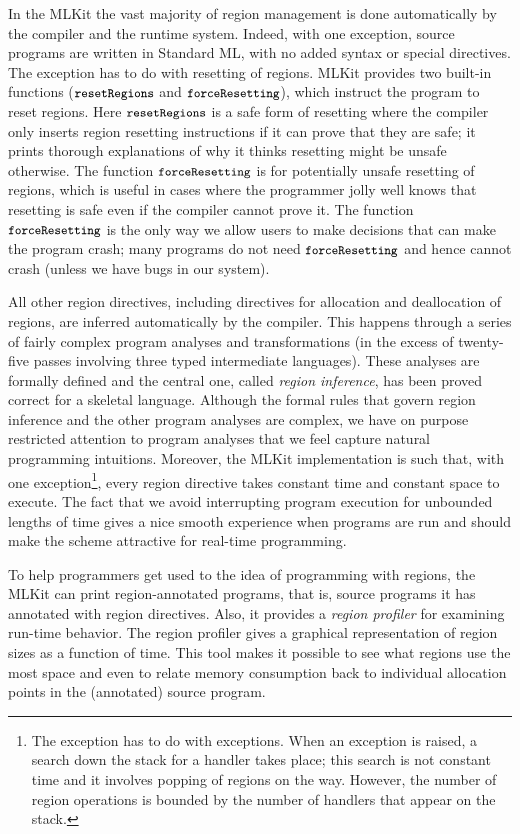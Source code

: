 \documentclass[12pt]{book}
\begin{document}
In the MLKit the vast majority of region management is done automatically by the
compiler and the runtime system.  Indeed, with one exception, source programs
are written in Standard ML, with no added syntax or special directives. The
exception has to do with resetting of regions. MLKit provides two built-in
functions
%
%
%
($\mbox{\small\ttfamily resetRegions}$ and $\mbox{\small\ttfamily forceResetting}$), which instruct the program to reset regions. Here
$\mbox{\small\ttfamily resetRegions}$ is a safe form of resetting where the compiler only inserts region
resetting instructions if it can prove that they are safe; it prints thorough
explanations of why it thinks resetting might be unsafe otherwise. The function
$\mbox{\small\ttfamily forceResetting}$ is for potentially unsafe resetting of regions, which is useful in
cases where the programmer jolly well knows that resetting is safe even if the
compiler cannot prove it. The function $\mbox{\small\ttfamily forceResetting}$ is the only way we allow users
to make decisions that can make the program crash; many programs do not need
$\mbox{\small\ttfamily forceResetting}$ and hence cannot crash (unless we have bugs in our system).

All other region directives, including directives for allocation and
deallocation of regions, are inferred automatically by the compiler.  This
happens through a series of fairly complex program analyses and transformations
(in the excess of twenty-five passes involving three typed intermediate
languages). These analyses are formally defined and the central one, called
%
%
{\em region inference}, has been proved correct for a skeletal
language. Although the formal rules that govern region inference and the other
program analyses are complex, we have on purpose restricted attention to program
analyses that we feel capture natural programming intuitions.  Moreover, the
MLKit implementation is such that, with one exception\footnote{The exception has
to do with exceptions. When an exception is raised, a search down the stack for
a handler takes place; this search is not constant time and it involves popping
of regions on the way. However, the number of region operations is bounded by
the number of handlers that appear on the stack.}, every region directive takes
constant time and constant space to execute.  The fact that we avoid
interrupting program execution for unbounded lengths of time gives a nice smooth
experience when programs are run and should make the scheme attractive for
real-time programming.

To help programmers get used to the idea of programming with regions, the MLKit
can print region-annotated programs, that is, source programs it has annotated
with region directives. Also, it provides a
%
%
\emph{region profiler} for examining run-time behavior.  The region profiler
gives a graphical representation of region sizes as a function of time. This
tool makes it possible to see what regions use the most space and even to relate
memory consumption back to individual allocation points in the (annotated)
source program.
\end{document}
